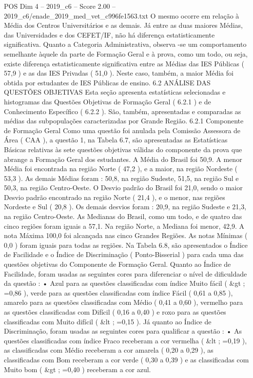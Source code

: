 \begin{textsample}{POS Dim 4 – 2019\_c6 – Score 2.00 – 2019\_c6/enade\_2019\_med\_vet\_c996fe1563.txt}
O mesmo ocorre em relação à Média dos Centros Universitários e as demais.
Já entre as duas maiores Médias, das Universidades e dos CEFET/IF, não há diferença estatisticamente significativa.
Quanto a Categoria Administrativa, observa -se um comportamento semelhante àquele da parte de Formação Geral e à prova, como um todo, ou seja, existe diferença estatisticamente significativa entre as Médias das IES Públicas ( 57,9 ) e as das IES Privadas ( 51,0 ).
Neste caso, também, a maior Média foi obtida por estudantes de IES Públicas de ensino. 6.2 ANÁLISE DAS QUESTÕES OBJETIVAS Esta seção apresenta estatísticas selecionadas e histogramas das Questões Objetivas de Formação Geral ( 6.2.1 ) e de Conhecimento Específico ( 6.2.2 ).
São, também, apresentadas e comparadas as médias das subpopulações caracterizadas por Grande Região. 6.2.1 Componente de Formação Geral Como uma questão foi anulada pela Comissão Assessora de Área ( CAA ), a questão 1, na Tabela 6.7, são apresentadas as Estatísticas Básicas relativas às sete questões objetivas válidas do componente da prova que abrange a Formação Geral dos estudantes.
A Média do Brasil foi 50,9.
A menor Média foi encontrada na região Norte ( 47,2 ), e a maior, na região Nordeste ( 53,3 ).
As demais Médias foram : 50,8, na região Sudeste, 51,5, na região Sul e 50,3, na região Centro-Oeste.
O Desvio padrão do Brasil foi 21,0, sendo o maior Desvio padrão encontrado na região Norte ( 21,4 ), e o menor, nas regiões Nordeste e Sul ( 20,8 ).
Os demais desvios foram : 20,9, na região Sudeste e 21,3, na região Centro-Oeste.
As Medianas do Brasil, como um todo, e de quatro das cinco regiões foram iguais a 57,1.
Na região Norte, a Mediana foi menor, 42,9.
A nota Máxima 100,0 foi alcançada nas cinco Grandes Regiões.
As notas Mínimas ( 0,0 ) foram iguais para todas as regiões.
Na Tabela 6.8, são apresentados o Índice de Facilidade e o Índice de Discriminação ( Ponto-Bisserial ) para cada uma das questões objetivas do Componente de Formação Geral.
Quanto ao Índice de Facilidade, foram usadas as seguintes cores para diferenciar o nível de dificuldade da questão : • Azul para as questões classificadas com índice Muito fácil ( \&gt ; =0,86 ), verde para as questões classificadas com índice Fácil ( 0,61 a 0,85 ), amarelo para as questões classificadas com Médio ( 0,41 a 0,60 ), vermelho para as questões classificadas com Difícil ( 0,16 a 0,40 ) e roxo para as questões classificadas com Muito difícil ( \&lt ; =0,15 ).
Já quanto ao Índice de Discriminação, foram usadas as seguintes cores para qualificar a questão : • As questões classificadas com índice Fraco receberam a cor vermelha ( \&lt ; =0,19 ), as classificadas com Médio receberam a cor amarela ( 0,20 a 0,29 ), as classificadas com Bom receberam a cor verde ( 0,30 a 0,39 ) e as classificadas com Muito bom ( \&gt ; =0,40 ) receberam a cor azul.

\end{textsample}
